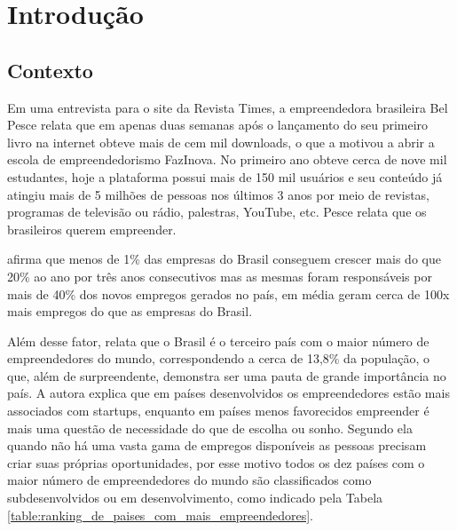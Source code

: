 \chapter{Introdução}
\label{cap-introducao}

\section{Contexto}
\label{section:contexto}

Em uma entrevista para o site da Revista Times, a empreendedora brasileira Bel Pesce relata que em apenas duas semanas após o lançamento do seu primeiro livro na internet obteve mais de cem mil downloads, o que a motivou a abrir a escola de empreendedorismo FazInova. No primeiro ano obteve cerca de nove mil estudantes, hoje a plataforma possui mais de 150 mil usuários e seu conteúdo já atingiu mais de 5 milhões de pessoas nos últimos 3 anos por meio de revistas, programas de televisão ou rádio, palestras, YouTube, etc. Pesce relata que os brasileiros querem empreender.

 afirma que menos de 1\% das empresas do Brasil conseguem crescer mais do que 20\% ao ano por três anos consecutivos mas as mesmas foram responsáveis por mais de 40\% dos novos empregos gerados no país, em média geram cerca de 100x mais empregos do que as empresas do Brasil. 

Além desse fator,  relata que o Brasil é o terceiro país com o maior número de empreendedores do mundo, correspondendo a cerca de 13,8\% da população, o que, além de surpreendente, demonstra ser uma pauta de grande importância no país. A autora explica que em países desenvolvidos os empreendedores estão mais associados com startups, enquanto em países menos favorecidos empreender é mais uma questão de necessidade do que de escolha ou sonho. Segundo ela quando não há uma vasta gama de empregos disponíveis as pessoas precisam criar suas próprias oportunidades, por esse motivo todos os dez países com o maior número de empreendedores do mundo são classificados como subdesenvolvidos ou em desenvolvimento, como indicado pela Tabela \ref{table:ranking_de_paises_com_mais_empreendedores}.

